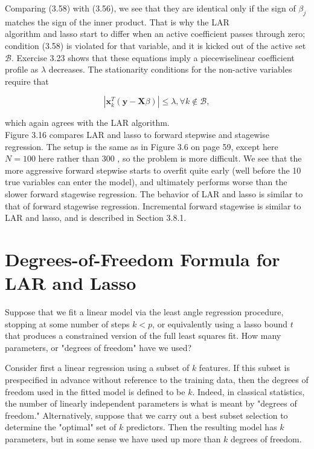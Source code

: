 \documentclass[10pt]{article}
\begin{document}
Comparing (3.58) with (3.56), we see that they are identical only if the sign of $\beta_{j}$ matches the sign of the inner product. That is why the LAR\\
algorithm and lasso start to differ when an active coefficient passes through zero; condition (3.58) is violated for that variable, and it is kicked out of the active set $\mathcal{B}$. Exercise 3.23 shows that these equations imply a piecewiselinear coefficient profile as $\lambda$ decreases. The stationarity conditions for the non-active variables require that


\begin{equation*}
\left|\mathbf{x}_{k}^{T}(\mathbf{y}-\mathbf{X} \beta)\right| \leq \lambda, \forall k \notin \mathcal{B}, \tag{3.59}
\end{equation*}


which again agrees with the LAR algorithm.\\
Figure 3.16 compares LAR and lasso to forward stepwise and stagewise regression. The setup is the same as in Figure 3.6 on page 59, except here $N=100$ here rather than 300 , so the problem is more difficult. We see that the more aggressive forward stepwise starts to overfit quite early (well before the 10 true variables can enter the model), and ultimately performs worse than the slower forward stagewise regression. The behavior of LAR and lasso is similar to that of forward stagewise regression. Incremental forward stagewise is similar to LAR and lasso, and is described in Section 3.8.1.

\section*{Degrees-of-Freedom Formula for LAR and Lasso}
Suppose that we fit a linear model via the least angle regression procedure, stopping at some number of steps $k<p$, or equivalently using a lasso bound $t$ that produces a constrained version of the full least squares fit. How many parameters, or "degrees of freedom" have we used?

Consider first a linear regression using a subset of $k$ features. If this subset is prespecified in advance without reference to the training data, then the degrees of freedom used in the fitted model is defined to be $k$. Indeed, in classical statistics, the number of linearly independent parameters is what is meant by "degrees of freedom." Alternatively, suppose that we carry out a best subset selection to determine the "optimal" set of $k$ predictors. Then the resulting model has $k$ parameters, but in some sense we have used up more than $k$ degrees of freedom.
\end{document}
